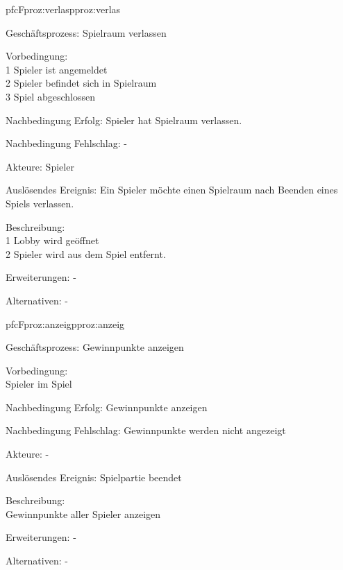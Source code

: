 \begin{description}[leftmargin=3em, style=sameline]
	\begin{php}{pfc}{F}{proz:verlas}{pproz:verlas}
		\item [Geschäftsprozess:] Spielraum verlassen
		\item [Vorbedingung:]\hfill\\
		1 Spieler ist angemeldet \\
		2 Spieler befindet sich in Spielraum \\
		3 Spiel abgeschlossen
		\item [Nachbedingung Erfolg:] Spieler hat Spielraum verlassen.
		\item [Nachbedingung Fehlschlag:] -
		\item [Akteure:] Spieler
		\item [Auslösendes Ereignis:] Ein Spieler möchte einen Spielraum nach Beenden eines Spiels verlassen.
		\item [Beschreibung:] \hfill\\
		1 Lobby wird geöffnet \\
		2 Spieler wird aus dem Spiel entfernt.
		\item [Erweiterungen:] - 
		\item [Alternativen:] -
	\end{php}
	
	\begin{php}{pfc}{F}{proz:anzeig}{pproz:anzeig}
		\item [Geschäftsprozess:] Gewinnpunkte anzeigen
		\item [Vorbedingung:]\hfill\\
		Spieler im Spiel 
		\item [Nachbedingung Erfolg:] Gewinnpunkte anzeigen
		\item [Nachbedingung Fehlschlag:] Gewinnpunkte werden nicht angezeigt
		\item [Akteure:] -
		\item [Auslösendes Ereignis:] Spielpartie beendet
		\item [Beschreibung:]\hfill\\
		Gewinnpunkte aller Spieler anzeigen
		\item [Erweiterungen:] -
		\item [Alternativen:] -
	\end{php}
	

\end{description}
